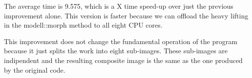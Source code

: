 \documentclass[12pt]{article}
\begin{document}
The average time is 9.575, which is a X time speed-up over just the previous improvement alone. This version
is faster because we can offload the heavy lifting in the modell::morph method to all eight CPU cores.

This improvement does not change the fundamental operation of the program because it just splits the work
into eight sub-images. These sub-images are indipendent and the resulting composite image is the same
as the one produced by the original code.
\end{document}
